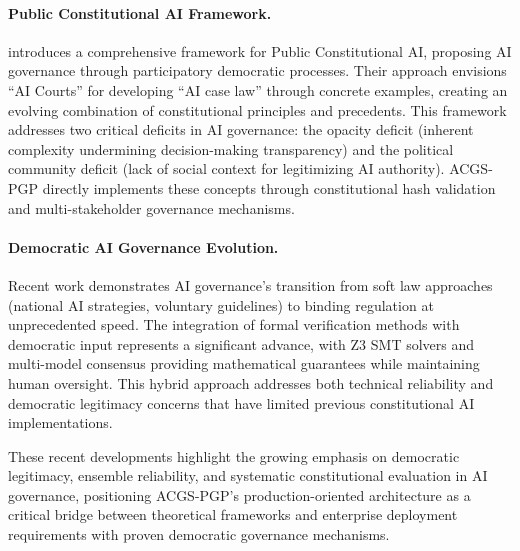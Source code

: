 \documentclass[manuscript,screen,9pt]{acmart}
\begin{document}
\paragraph{Public Constitutional AI Framework.} \citet{Abiri2024PublicConstitutional} introduces a comprehensive framework for Public Constitutional AI, proposing AI governance through participatory democratic processes. Their approach envisions ``AI Courts'' for developing ``AI case law'' through concrete examples, creating an evolving combination of constitutional principles and precedents. This framework addresses two critical deficits in AI governance: the opacity deficit (inherent complexity undermining decision-making transparency) and the political community deficit (lack of social context for legitimizing AI authority). ACGS-PGP directly implements these concepts through constitutional hash validation and multi-stakeholder governance mechanisms.

\paragraph{Democratic AI Governance Evolution.} Recent work demonstrates AI governance's transition from soft law approaches (national AI strategies, voluntary guidelines) to binding regulation at unprecedented speed. The integration of formal verification methods with democratic input represents a significant advance, with Z3 SMT solvers and multi-model consensus providing mathematical guarantees while maintaining human oversight. This hybrid approach addresses both technical reliability and democratic legitimacy concerns that have limited previous constitutional AI implementations.

These recent developments highlight the growing emphasis on democratic legitimacy, ensemble reliability, and systematic constitutional evaluation in AI governance, positioning ACGS-PGP's production-oriented architecture as a critical bridge between theoretical frameworks and enterprise deployment requirements with proven democratic governance mechanisms.
\end{document}
